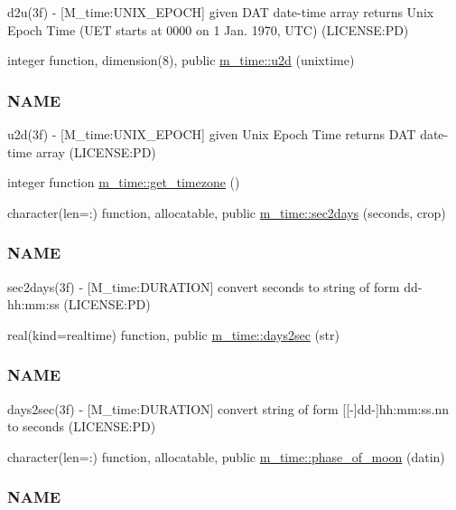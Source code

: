 \begin{DoxyCompactItemize}
\begin{DoxyCompactList}
d2u(3f) -\/ \mbox{[}M\+\_\+time\+:U\+N\+I\+X\+\_\+\+E\+P\+O\+CH\mbox{]} given D\+AT date-\/time array returns Unix Epoch Time (U\+ET starts at 0000 on 1 Jan. 1970, U\+TC) (L\+I\+C\+E\+N\+SE\+:PD) \end{DoxyCompactList}\item 
integer function, dimension(8), public \mbox{\hyperlink{namespacem__time_a083bc231f8ba1879d7f86ab424e77d6c}{m\+\_\+time\+::u2d}} (unixtime)
\begin{DoxyCompactList}\small\item\em \subsubsection*{N\+A\+ME}

u2d(3f) -\/ \mbox{[}M\+\_\+time\+:U\+N\+I\+X\+\_\+\+E\+P\+O\+CH\mbox{]} given Unix Epoch Time returns D\+AT date-\/time array (L\+I\+C\+E\+N\+SE\+:PD) \end{DoxyCompactList}\item 
integer function \mbox{\hyperlink{namespacem__time_a7903410a1d28bcdf3d33ab0c2d74b124}{m\+\_\+time\+::get\+\_\+timezone}} ()
\item 
character(len=\+:) function, allocatable, public \mbox{\hyperlink{namespacem__time_a7788285d79b8d58323b05e9a30a2d992}{m\+\_\+time\+::sec2days}} (seconds, crop)
\begin{DoxyCompactList}\small\item\em \subsubsection*{N\+A\+ME}

sec2days(3f) -\/ \mbox{[}M\+\_\+time\+:D\+U\+R\+A\+T\+I\+ON\mbox{]} convert seconds to string of form dd-\/hh\+:mm\+:ss (L\+I\+C\+E\+N\+SE\+:PD) \end{DoxyCompactList}\item 
real(kind=realtime) function, public \mbox{\hyperlink{namespacem__time_a99393c7906f1989f90ece03969224938}{m\+\_\+time\+::days2sec}} (str)
\begin{DoxyCompactList}\small\item\em \subsubsection*{N\+A\+ME}

days2sec(3f) -\/ \mbox{[}M\+\_\+time\+:D\+U\+R\+A\+T\+I\+ON\mbox{]} convert string of form \mbox{[}\mbox{[}-\/\mbox{]}dd-\/\mbox{]}hh\+:mm\+:ss.\+nn to seconds (L\+I\+C\+E\+N\+SE\+:PD) \end{DoxyCompactList}\item 
character(len=\+:) function, allocatable, public \mbox{\hyperlink{namespacem__time_ab8a976e2f113cc38b6df80974cee55dc}{m\+\_\+time\+::phase\+\_\+of\+\_\+moon}} (datin)
\begin{DoxyCompactList}\small\item\em \subsubsection*{N\+A\+ME}


\end{DoxyCompactList}
\end{DoxyCompactItemize}
